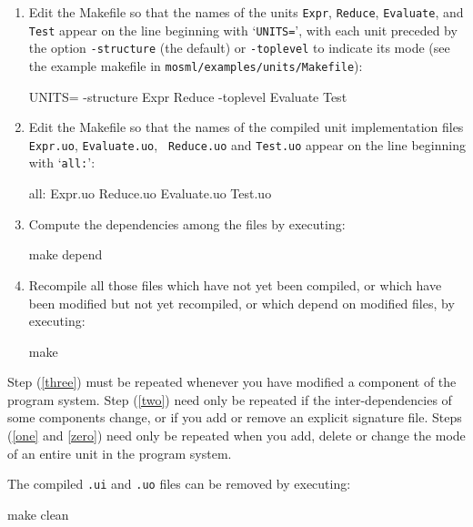 \documentclass[fleqn,a4paper]{article}
\begin{document}
\begin{enumerate}
\item\label{zero} Edit the Makefile so that the names of the units
  {\tt Expr}, {\tt Reduce}, {\tt Evaluate},  and {\tt Test} appear on the line beginning
  with `{\tt UNITS=}', with each unit preceded by the option {\tt -structure} (the default) or
  {\tt -toplevel}
  to indicate its mode
  (see the example makefile in \texttt{mosml/examples/units/Makefile}):

\begin{program}
UNITS= -structure Expr Reduce -toplevel Evaluate Test
\end{program}

\item\label{one} Edit the Makefile so that the names of the compiled
  unit implementation files {\tt Expr.uo}, {\tt Evaluate.uo}, {\tt
    Reduce.uo} and {\tt Test.uo} appear on the line beginning with
  `{\tt all:}':

\begin{program}
all: Expr.uo Reduce.uo Evaluate.uo Test.uo
\end{program}

\item\label{two} Compute the dependencies among the files by executing:

\begin{program}
make depend
\end{program}

\item\label{three} Recompile all those files which have not yet been compiled, or
  which have been modified but not yet recompiled, or which depend on
  modified files, by executing:
        
\begin{program}
make    
\end{program}
\end{enumerate}

\noindent Step (\ref{three}) must be repeated whenever you have modified a
component of the program system.  Step (\ref{two}) need only be repeated if
the inter-dependencies of some components change, or if you add or
remove an explicit signature file.  Steps (\ref{one} and \ref{zero}) need only be repeated
when you add, delete or change the mode of an entire unit in the program system.

The compiled {\tt *.ui} and {\tt *.uo} files can be removed by executing:

\begin{program}
make clean  
\end{program}
\end{document}
